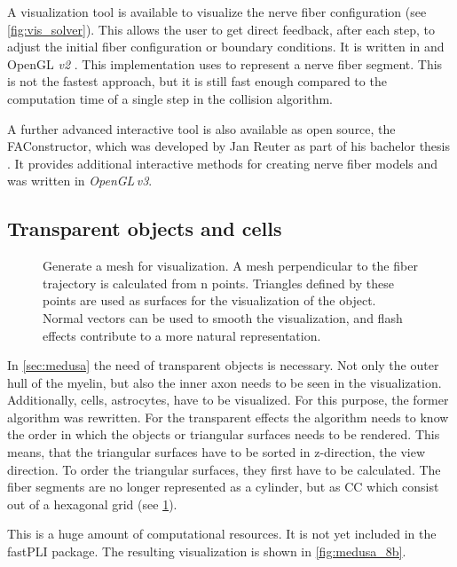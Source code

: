 %
A visualization tool is available to visualize the nerve fiber configuration (see \cref{fig:vis_solver}).
This allows the user to get direct feedback, \eg{} after each step, to adjust the initial fiber configuration or boundary conditions.
It is written in \cpp{} and \ac{OpenGL} \textit{v2} \cite{isocpp, khronos}.
This implementation uses  to represent a nerve fiber segment.
This is not the fastest approach, but it is still fast enough compared to the computation time of a single step in the collision algorithm.
\par
% 
A further advanced interactive tool is also available as open source, the FAConstructor, which was developed by Jan Reuter as part of his bachelor thesis \cite{Reuter2019}.
It provides additional interactive methods for creating nerve fiber models and was written in \textit{OpenGL\,v3}.
\subsection{Transparent objects and cells}
%
\begin{figure}[!t]
    \centering
    \setlength{\tikzwidth}{0.75\textwidth}
	\caption{Generate a mesh for visualization. A mesh perpendicular to the fiber trajectory is calculated from n points. Triangles defined by these points are used as surfaces for the visualization of the object. Normal vectors can be used to smooth the visualization, and flash effects contribute to a more natural representation.}
	\label{fig:vis_mesh}
\end{figure}
%
In \cref{sec:medusa} the need of transparent objects is necessary.
Not only the outer hull of the myelin, but also the inner axon needs to be seen in the visualization.
Additionally, cells, \eg{} astrocytes, have to be visualized.
For this purpose, the former algorithm was rewritten.
For the transparent effects the algorithm needs to know the order in which the objects or triangular surfaces needs to be rendered.
This means, that the triangular surfaces have to be sorted in z-direction, \ie{} the view direction.
To order the triangular surfaces, they first have to be calculated.
The fiber segments are no longer represented as a cylinder, but as \ac{CC} which consist out of a hexagonal grid (see \cref{fig:vis_mesh}).
\par
% 
This is a huge amount of computational resources.
It is not yet included in the \ac{fastPLI} package.
The resulting visualization is shown in \cref{fig:medusa_8b}.
% 
% 
% 

